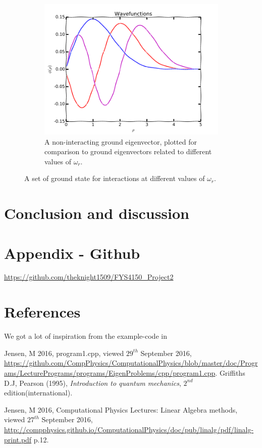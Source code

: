 \documentclass[11pt,a4paper,notitlepage]{article}
\begin{document}
\begin{figure}[H]
\begin{subfigure}[t]{0.45\textwidth}
		\includegraphics[scale=0.40]{../eigvecs_vs_each_other.png}
		\caption{A non-interacting ground eigenvector, plotted for comparison to ground eigenvectors related to different values of $\omega_r$.}\label{fig:ground-eigvecs-compare}
	\end{subfigure}
	\caption{A set of ground state for interactions at different values of $\omega_r$.}\label{fig:eigvecs-interact}
\end{figure}


\section{Conclusion and discussion}
\section{Appendix - Github} \label{section:github}
\url{https://github.com/theknight1509/FYS4150_Project2}
\section{References}
We got a lot of inspiration from the example-code in \cite[web-site]{example_code}

\begin{thebibliography}{9}

  Jensen, M 2016,
  program1.cpp,
  viewed $29^{th}$ September 2016,
  \url{https://github.com/CompPhysics/ComputationalPhysics/blob/master/doc/Programs/LecturePrograms/programs/EigenProblems/cpp/program1.cpp}.
  Griffiths D.J, 
  Pearson (1995),
  \emph{Introduction to quantum mechanics},
  $2^{nd}$ edition(international).
  
	Jensen, M 2016, 
	Computational Physics Lectures: Linear
Algebra methods, 
	viewed $27^{th}$ September 2016, 
	\url{http://compphysics.github.io/ComputationalPhysics/doc/pub/linalg/pdf/linalg-print.pdf} p.12. 

\end{thebibliography}
\end{document}
